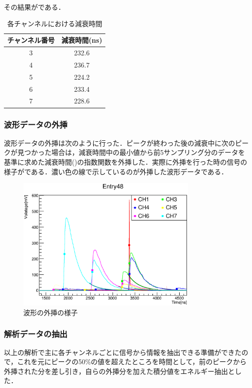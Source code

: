 その結果がである．

\begin{table}[bht]
  \centering
  \caption{各チャンネルにおける減衰時間}
  \begin{tabular}{cc}\\ \hline
    チャンネル番号 & 減衰時間(ns) \\ \hline
    3 & 232.6 \\
    4 & 236.7 \\
    5 & 224.2 \\
    6 & 233.4 \\
    7 & 228.6 \\ \hline
  \end{tabular}
  \label{hatano_tab:decaytime}
\end{table}

\subsubsection{波形データの外挿}
波形データの外挿は次のように行った．ピークが終わった後の減衰中に次のピークが見つかった場合は，減衰時間中の最小値から前5サンプリング分のデータを基準に求めた減衰時間()の指数関数を外挿した．実際に外挿を行った時の信号の様子がである．濃い色の線で示しているのが外挿した波形データである．

\begin{figure}[bht]
  \centering
  \includegraphics[width=0.8\textwidth]{figure/hatano/analysis.eps}
  \caption{波形の外挿の様子}
  \label{hatano_fig:analysis}
\end{figure}

\subsubsection{解析データの抽出}
以上の解析で主に各チャンネルごとに信号から情報を抽出できる準備ができたので，これを元にピークの50\%の値を超えたところを時間として，前のピークから外挿された分を差し引き，自らの外挿分を加えた積分値をエネルギー抽出とした．

